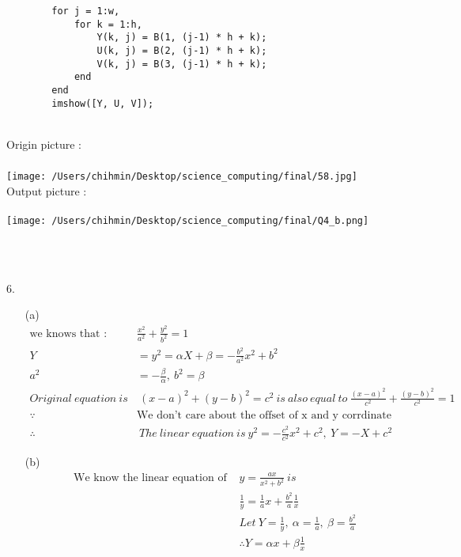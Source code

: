 \documentclass{article}
\begin{document}
\begin{enumerate*}
\begin{enumerate}
\begin{lstlisting}
		for j = 1:w,
			for k = 1:h,  
				Y(k, j) = B(1, (j-1) * h + k);
				U(k, j) = B(2, (j-1) * h + k);
				V(k, j) = B(3, (j-1) * h + k);
			end
		end
		imshow([Y, U, V]);
      \end{lstlisting} \ \\
	  Origin picture : \ \\ \ \\ 
      \texttt{[image: /Users/chihmin/Desktop/science\_computing/final/58.jpg]} \ \\
      Output picture : \ \\ \ \\
      \texttt{[image: /Users/chihmin/Desktop/science\_computing/final/Q4\_b.png]}
	
    \end{enumerate} \ \\ \ \\  
    
    \item [6.] 
     \begin{enumerate}
       \item [(a)] \text{}
          \begin{align*}
            \text{we knows that :} & \frac{x^2}{a^2} + \frac{y^2}{b^2}  = 1  \\
            Y & = y^2 = \alpha X + \beta = - \frac{b^2}{a^2} x^2 + b^2 \\
            a^2 & = -\frac{\beta}{\alpha},\ b^2 = \beta \\
            Original\ equation\ is & \ (x-a)^2+(y-b)^2=c^2\ is\ also\ equal\ to\  \frac{(x-a)^2}{c^2} + \frac{(y-b)^2}{c^2}=1 \\ 
            \because &\text{We don't care about the offset of x and y corrdinate}\\
            \therefore& \ The\ linear\ equation\ is\ y^2=-\frac{c^2}{c^2}x^2+c^2,\ Y=-X+c^2
          \end{align*}
        
        \item [(b)] \text{}
          \begin{align*}
            \text{We know the linear equation of } & y=\frac{ax}{x^2+b^2}\ is \\
            & \frac{1}{y} = \frac{1}{a}x+\frac{b^2}{a}\frac{1}{x} \\
            & Let\  Y=\frac{1}{y},\ \alpha=\frac{1}{a},\ \beta=\frac{b^2}{a} \\
            & \therefore Y = \alpha x+\beta\frac{1}{x}
          \end{align*}


\end{enumerate}
\end{enumerate*}
\end{document}
